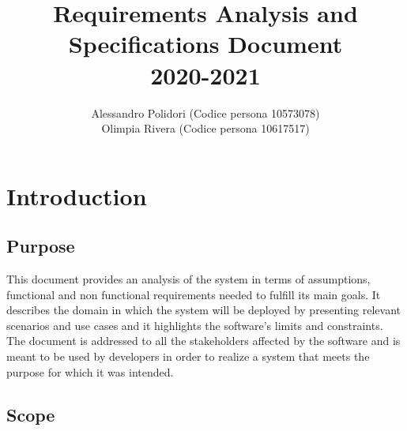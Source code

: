 \documentclass{article}
\title{ Requirements Analysis and Specifications Document\\2020-2021}
\author{Alessandro Polidori (Codice persona 10573078)\\Olimpia Rivera (Codice persona 10617517)}
\date{}
\begin{document}
\maketitle
\tableofcontents{}

\newpage

\section{Introduction}

\subsection{Purpose}
This document provides an analysis of the system in terms of assumptions, functional and non functional requirements needed to fulfill its main goals. It describes the domain in which the system will be deployed by presenting relevant scenarios and use cases and it highlights the software’s limits and constraints.
\bigskip\\
The document is addressed to all the stakeholders affected by the software and is meant to be used by developers in order to realize a system that meets the purpose for which it was intended.\\

\subsection{Scope}
\end{document}
